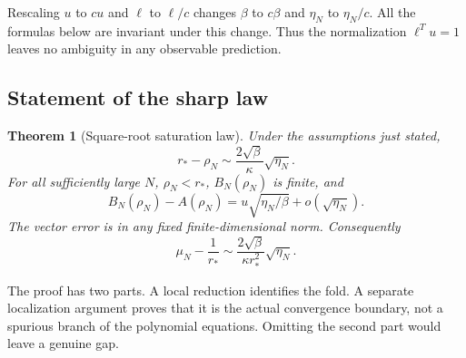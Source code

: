 \documentclass[11pt,a4paper]{article}
\newtheorem{theorem}{Theorem}[section]
\theoremstyle{definition}
\theoremstyle{remark}
\begin{document}
Rescaling $u$ to $cu$ and $\ell$ to $\ell/c$ changes $\beta$ to $c\beta$
and $\eta_N$ to $\eta_N/c$. All the formulas below are invariant under
this change. Thus the normalization $\ell^Tu=1$ leaves no ambiguity in
any observable prediction.

\subsection{Statement of the sharp law}
\begin{theorem}[Square-root saturation law]\label{kfp:sat:thm:sharp}
Under the assumptions just stated,
\begin{equation}\label{kfp:sat:eq:sharp-radius}
 \boxed{\displaystyle
 r_*-\rho_N\sim\frac{2\sqrt\beta}{\kappa}\sqrt{\eta_N}.}
\end{equation}
For all sufficiently large $N$, $\rho_N<r_*$, $B_N(\rho_N)$ is finite,
and
\begin{equation}\label{kfp:sat:eq:sharp-height}
 \boxed{\displaystyle
 B_N(\rho_N)-A(\rho_N)
 =u\sqrt{\eta_N/\beta}+o(\sqrt{\eta_N}).}
\end{equation}
The vector error is in any fixed finite-dimensional norm. Consequently
\begin{equation}\label{kfp:sat:eq:sharp-growth}
 \mu_N-\frac1{r_*}
 \sim \frac{2\sqrt\beta}{\kappa r_*^2}\sqrt{\eta_N}.
\end{equation}
\end{theorem}

The proof has two parts. A local reduction identifies the fold. A separate
localization argument proves that it is the actual convergence boundary,
not a spurious branch of the polynomial equations. Omitting the second
part would leave a genuine gap.
\end{document}
